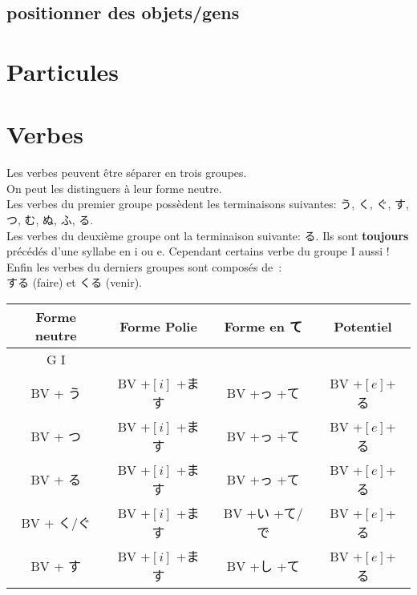 \documentclass{article}
\begin{document}
    \subsection{positionner des objets/gens}


\section{Particules}


\section{Verbes}
\begin{CJK}{UTF8}{min}
    Les verbes peuvent être séparer en trois groupes.\\
    On peut les distinguers à leur forme neutre.\\
    Les verbes du premier groupe possèdent les terminaisons suivantes:
    う, く, ぐ, す, つ, む, ぬ, ふ, る.\\
    Les verbes du deuxième groupe ont la terminaison suivante:
    る. Ils sont \textbf{toujours} précédés d'une syllabe en i ou e. Cependant certains verbe du groupe I aussi !\\
    Enfin les verbes du derniers groupes sont composés de~:\\
    する (faire) et くる (venir).\\
\begin{center}
\begin{tabular} {|c|c|c|c|}
    \hline
    Forme neutre & Forme Polie & Forme en て & Potentiel \\
    \hline
    G I& &&\\
    BV + う      & BV +$[i]$ +ます &BV +っ +て    &BV +$[e]$+ る\\ 
    BV + つ      & BV +$[i]$ +ます &BV +っ +て    &BV +$[e]$+ る\\ 
    BV + る      & BV +$[i]$ +ます &BV +っ +て    &BV +$[e]$+ る\\
    
    BV + く/ぐ   & BV +$[i]$ +ます &BV +い +て/で &BV +$[e]$+ る\\ 
    
    BV + す      & BV +$[i]$ +ます &BV +し +て    &BV +$[e]$+ る\\ 


\end{tabular}
\end{center}
\end{CJK}
\end{document}

